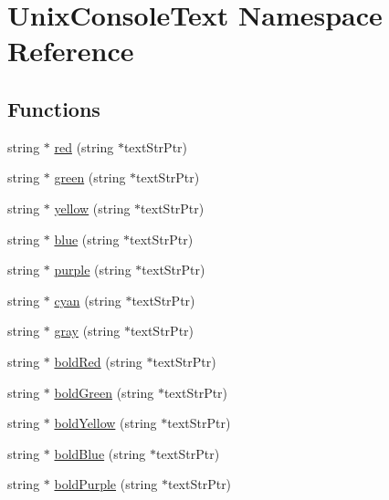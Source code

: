 \hypertarget{namespace_unix_console_text}{\section{Unix\-Console\-Text Namespace Reference}
\label{namespace_unix_console_text}
}
\subsection*{Functions}
\begin{DoxyCompactItemize}
\item 
string $\ast$ \hyperlink{namespace_unix_console_text_a08a2fae9dfa6df54be6aa53490d4cee3}{red} (string $\ast$text\-Str\-Ptr)
\item 
string $\ast$ \hyperlink{namespace_unix_console_text_a9b518813d096500605821b99082c0845}{green} (string $\ast$text\-Str\-Ptr)
\item 
string $\ast$ \hyperlink{namespace_unix_console_text_a8ad6638a6663d3b2b6c0d00faec6438e}{yellow} (string $\ast$text\-Str\-Ptr)
\item 
string $\ast$ \hyperlink{namespace_unix_console_text_a32531e5b0b5711cc22e7ca6e09921b67}{blue} (string $\ast$text\-Str\-Ptr)
\item 
string $\ast$ \hyperlink{namespace_unix_console_text_a1c7c0b40a1156e1b513bf9cea29bb72e}{purple} (string $\ast$text\-Str\-Ptr)
\item 
string $\ast$ \hyperlink{namespace_unix_console_text_ab00fc9eacb44b0bafacffb506092bcbe}{cyan} (string $\ast$text\-Str\-Ptr)
\item 
string $\ast$ \hyperlink{namespace_unix_console_text_a464cf03d2963bbbbf988c4660fd8f064}{gray} (string $\ast$text\-Str\-Ptr)
\item 
string $\ast$ \hyperlink{namespace_unix_console_text_af66c25dcb55b26bfdb2e75f36204ad6d}{bold\-Red} (string $\ast$text\-Str\-Ptr)
\item 
string $\ast$ \hyperlink{namespace_unix_console_text_a62cf8804973796c299289560e38ac8b7}{bold\-Green} (string $\ast$text\-Str\-Ptr)
\item 
string $\ast$ \hyperlink{namespace_unix_console_text_aee618445feccbe7ee1192f1b1b8948e7}{bold\-Yellow} (string $\ast$text\-Str\-Ptr)
\item 
string $\ast$ \hyperlink{namespace_unix_console_text_a2d7d1f2ddc072b69b9e85f1f4bf31587}{bold\-Blue} (string $\ast$text\-Str\-Ptr)
\item 
string $\ast$ \hyperlink{namespace_unix_console_text_a2533224f2f47dc725b659479065cd58a}{bold\-Purple} (string $\ast$text\-Str\-Ptr)

\end{DoxyCompactItemize}
